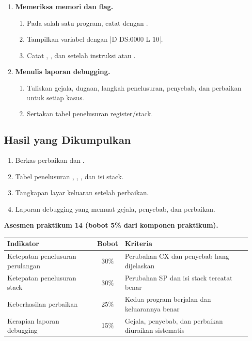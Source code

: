 \begin{enumerate}
    \item \textbf{Memeriksa memori dan flag.}
    \begin{enumerate}
        \item Pada salah satu program, catat  dengan
              .
        \item Tampilkan variabel dengan \lstasm|D DS:0000 L 10|.
        \item Catat , , dan  setelah
              instruksi  atau .
    \end{enumerate}

    \item \textbf{Menulis laporan debugging.}
    \begin{enumerate}
        \item Tuliskan gejala, dugaan, langkah penelusuran, penyebab,
              dan perbaikan untuk setiap kasus.
        \item Sertakan tabel penelusuran register/stack.
    \end{enumerate}
\end{enumerate}

\subsection{Hasil yang Dikumpulkan}

\begin{enumerate}
    \item Berkas perbaikan  dan
          .
    \item Tabel penelusuran , , , dan isi
          stack.
    \item Tangkapan layar keluaran setelah perbaikan.
    \item Laporan debugging yang memuat gejala, penyebab, dan
          perbaikan.
\end{enumerate}

\begin{asesmenbox}
\vspace{1.1em}
\textbf{Asesmen praktikum 14 (bobot 5\% dari komponen praktikum).}

\begin{tabular}{@{}p{6.2cm}cp{4.6cm}@{}}
    \toprule
    \textbf{Indikator} & \textbf{Bobot} & \textbf{Kriteria} \\
    \midrule
    Ketepatan penelusuran perulangan & 30\% &
    Perubahan CX dan penyebab hang dijelaskan \\
    \addlinespace
    Ketepatan penelusuran stack & 30\% &
    Perubahan SP dan isi stack tercatat benar \\
    \addlinespace
    Keberhasilan perbaikan & 25\% &
    Kedua program berjalan dan keluarannya benar \\
    \addlinespace
    Kerapian laporan debugging & 15\% &
    Gejala, penyebab, dan perbaikan diuraikan sistematis \\
    \bottomrule
\end{tabular}
\end{asesmenbox}
